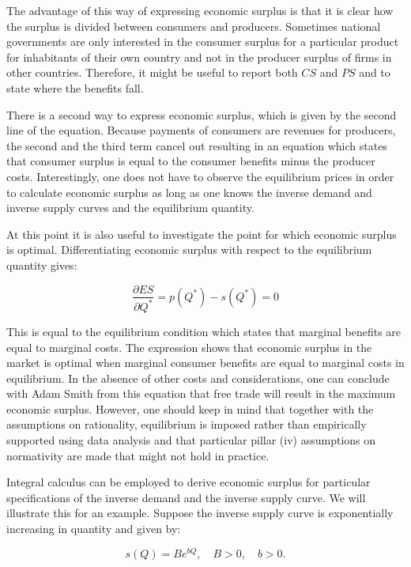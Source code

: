 \documentclass[
]{book}
\begin{document}
The advantage of this way of expressing economic surplus is that it is clear how the surplus is divided between consumers and producers. Sometimes national governments are only interested in the consumer surplus for a particular product for inhabitants of their own country and not in the producer surplus of firms in other countries. Therefore, it might be useful to report both \(CS\) and \(PS\) and to state where the benefits fall.

There is a second way to express economic surplus, which is given by the second line of the equation. Because payments of consumers are revenues for producers, the second and the third term cancel out resulting in an equation which states that consumer surplus is equal to the consumer benefits minus the producer costs. Interestingly, one does not have to observe the equilibrium prices in order to calculate economic surplus as long as one knows the inverse demand and inverse supply curves and the equilibrium quantity.

At this point it is also useful to investigate the point for which economic surplus is optimal. Differentiating economic surplus with respect to the equilibrium quantity gives:

\begin{equation}
\frac{\partial ES}{\partial Q^\ast} = p(Q^\ast) - s(Q^\ast) = 0
\end{equation}

This is equal to the equilibrium condition which states that marginal benefits are equal to marginal costs. The expression shows that economic surplus in the market is optimal when marginal consumer benefits are equal to marginal costs in equilibrium. In the absence of other costs and considerations, one can conclude with Adam Smith from this equation that free trade will result in the maximum economic surplus. However, one should keep in mind that together with the assumptions on rationality, equilibrium is imposed rather than empirically supported using data analysis and that particular pillar (iv) assumptions on normativity are made that might not hold in practice.

Integral calculus can be employed to derive economic surplus for particular specifications of the inverse demand and the inverse supply curve. We will illustrate this for an example. Suppose the inverse supply curve is exponentially increasing in quantity and given by:

\begin{equation}
s(Q) = B e^{bQ}, \quad B>0, \quad b >0.
\end{equation}
\end{document}
